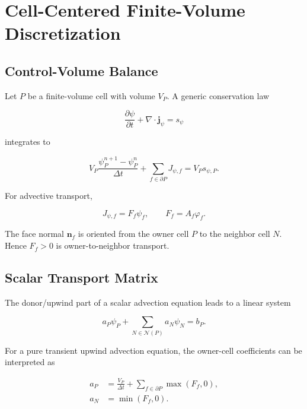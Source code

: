 \documentclass[11pt]{article}
\newcommand{\divergence}{\nabla\!\cdot}
\newcommand{\nb}{\mathcal{N}}
\begin{document}
\section{Cell-Centered Finite-Volume Discretization}

\subsection{Control-Volume Balance}

Let \(P\) be a finite-volume cell with volume \(V_P\).  A generic conservation
law

\begin{equation}
  \frac{\partial\psi}{\partial t}
  +
  \divergence\mathbf{j}_{\psi}
  =
  s_\psi
\end{equation}

integrates to

\begin{equation}
  V_P
  \frac{\psi_P^{n+1}-\psi_P^n}{\Delta t}
  +
  \sum_{f\in\partial P}
  J_{\psi,f}
  =
  V_P s_{\psi,P}.
  \label{eq:fv-balance}
\end{equation}

For advective transport,

\begin{equation}
  J_{\psi,f}=F_f\psi_f,
  \qquad
  F_f=A_f\varphi_f.
\end{equation}

The face normal \(\mathbf{n}_f\) is oriented from the owner cell \(P\) to the
neighbor cell \(N\).  Hence \(F_f>0\) is owner-to-neighbor transport.

\subsection{Scalar Transport Matrix}

The donor/upwind part of a scalar advection equation leads to a linear system

\begin{equation}
  a_P\psi_P+\sum_{N\in\nb(P)}a_N\psi_N=b_P.
\end{equation}

For a pure transient upwind advection equation, the owner-cell coefficients can
be interpreted as

\begin{align}
  a_P
  &=
  \frac{V_P}{\Delta t}
  +
  \sum_{f\in\partial P}\max(F_f,0),
  \\
  a_N
  &=
  \min(F_f,0).
\end{align}
\end{document}
